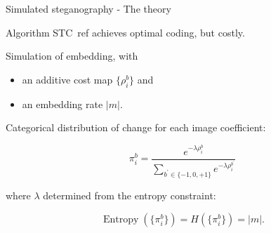 \documentclass[10pt]{beamer}
\begin{document}




\begin{frame}{Simulated steganography - The theory}

Algorithm STC~ref achieves optimal coding, but costly.

\pause



Simulation of embedding, with
\begin{itemize}
    \item an additive cost map $\{\rho_i^b\}$ and 
    \item an embedding rate $|m|$. 
\end{itemize}

\pause 

Categorical distribution of change for each image coefficient:

\begin{equation}
\pi_{i}^b =\frac{e^{-\lambda \rho_{i}^{b}}}{\sum_{b^{\prime} \in \{-1,0,+1\}} e^{-\lambda \rho_{i}^{b^{\prime}}}}
\end{equation}

where $\lambda$ determined from the entropy constraint:

\begin{equation}
\operatorname{Entropy}(\{\pi_i^b\}) = H(\{\pi_i^b\}) = |m|.
\end{equation}



\end{frame}
\end{document}
